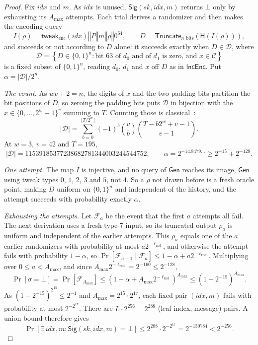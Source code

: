 \documentclass[11pt]{article}
\theoremstyle{definition}
\theoremstyle{plain}
\theoremstyle{remark}
\newcommand{\bits}[1]{\{0,1\}^{#1}}
\newcommand{\IncEnc}{\mathsf{IncEnc}}
\newcommand{\Gen}{\mathsf{Gen}}
\newcommand{\Sig}{\mathsf{Sig}}
\newcommand{\hash}{\mathsf{H}}
\newcommand{\Truncate}{\mathsf{Truncate}}
\newcommand{\concat}{\mathbin\Vert}
\newcommand{\idx}{\mathit{idx}}
\newcommand{\sk}{\mathit{sk}}
\newcommand{\lrnd}{\ell_{\mathrm{rnd}}}
\newcommand{\amax}{A_{\max}}
\begin{document}
\begin{proof}
Fix $\idx$ and $m$. As $\idx$ is unused, $\Sig(\sk,\idx,m)$ returns $\bot$ only by exhausting its $\amax$ attempts. Each trial derives a randomizer and then makes the encoding query
\[
  I(\rho)=\mathsf{tweak}_{\mathrm{enc}}(\idx)\concat P\concat m\concat\rho\concat0^{64},
  \qquad D=\Truncate_{n\text{ bits}}\!\left(\hash(I(\rho))\right),
\]
and succeeds or not according to $D$ alone: it succeeds exactly when $D\in\mathcal D$, where
\[
  \mathcal D=\left\{D\in\bits n:\text{bit }63\text{ of }d_0\text{ and of }d_1\text{ is zero, and }x\in\mathcal C\right\}
\]
is a fixed subset of $\bits n$, reading $d_0$, $d_1$ and $x$ off $D$ as in $\IncEnc$. Put $\alpha=|\mathcal D|/2^n$.

\emph{The count.} As $wv+2=n$, the digits of $x$ and the two padding bits partition the bit positions of $D$, so zeroing the padding bits puts $\mathcal D$ in bijection with the $x\in\{0,\ldots,2^w-1\}^v$ summing to $T$. Counting those is classical~\cite{Comtet74}:
\[
  |\mathcal D|=\sum_{b=0}^{\lfloor T/2^w\rfloor}(-1)^b\binom{v}{b}\binom{T-b2^w+v-1}{v-1}.
\]
At $w=3$, $v=42$ and $T=195$,
\[
  |\mathcal D|=11539185377238682781344003244544752,\qquad \alpha=2^{-14.8479\ldots}\geq2^{-15}+2^{-128}.
\]

\emph{One attempt.} The map $I$ is injective, and no query of $\Gen$ reaches its image, $\Gen$ using tweak types $0$, $1$, $2$, $3$ and $5$, not $4$. So a $\rho$ not drawn before is a fresh oracle point, making $D$ uniform on $\bits n$ and independent of the history, and the attempt succeeds with probability exactly $\alpha$.

\emph{Exhausting the attempts.} Let $\mathcal F_a$ be the event that the first $a$ attempts all fail. The next derivation uses a fresh type-7 input, so its truncated output $\rho_a$ is uniform and independent of the earlier attempts. This $\rho_a$ equals one of the $a$ earlier randomizers with probability at most $a2^{-\lrnd}$, and otherwise the attempt fails with probability $1-\alpha$, so $\Pr[\mathcal F_{a+1}\mid\mathcal F_a]\leq1-\alpha+a2^{-\lrnd}$. Multiplying over $0\leq a<\amax$, and since $\amax2^{-\lrnd}=2^{-160}\leq2^{-128}$,
\[
  \Pr[\sigma=\bot]=\Pr[\mathcal F_{\amax}]\leq\left(1-\alpha+\amax2^{-\lrnd}\right)^{\amax}\leq\left(1-2^{-15}\right)^{\amax}.
\]
As $\left(1-2^{-15}\right)^{2^{15}}\leq2^{-1}$ and $\amax=2^{15}\cdot2^{17}$, each fixed pair $(\idx,m)$ fails with probability at most $2^{-2^{17}}$. There are $L\cdot2^{256}=2^{288}$ (leaf index, message) pairs. A union bound therefore gives
\[
  \Pr[\exists\,\idx,m:\Sig(\sk,\idx,m)=\bot]
  \leq2^{288}\cdot2^{-2^{17}}
  =2^{-130784}<2^{-256}.
\]
\end{proof}



\end{document}
